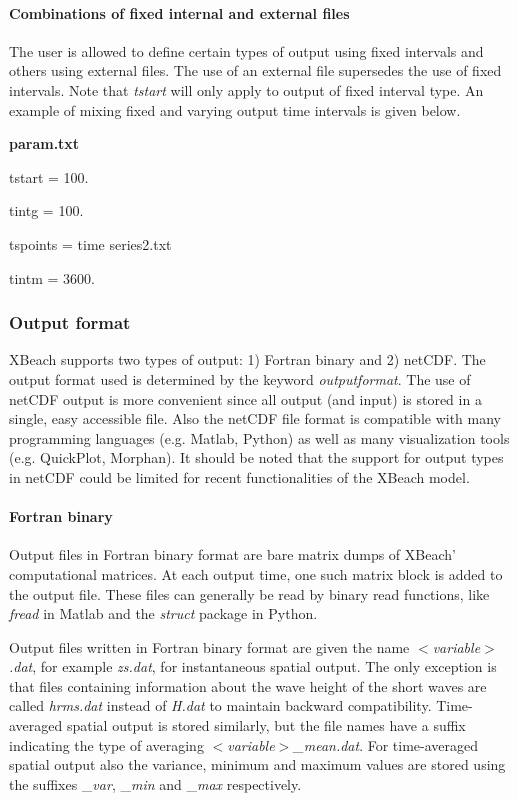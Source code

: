 \documentclass{article}
\begin{document}
\paragraph{ Combinations of fixed internal and external files}

\noindent The user is allowed to define certain types of output using fixed intervals and others using external files. The use of an external file supersedes the use of fixed intervals. Note that \textit{tstart} will only apply to output of fixed interval type. An example of mixing fixed and varying output time intervals is given below.

\noindent \textbf{param.txt}

\noindent tstart = 100.

\noindent tintg = 100.

\noindent tspoints = time series2.txt

\noindent tintm = 3600.


\subsubsection{ Output format}

\noindent XBeach supports two types of output: 1) Fortran binary and 2) netCDF. The output format used is determined by the keyword \textit{outputformat}. The use of netCDF output is more convenient since all output (and input) is stored in a single, easy accessible file. Also the netCDF file format is compatible with many programming languages (e.g. Matlab, Python) as well as many visualization tools (e.g. QuickPlot, Morphan). It should be noted that the support for output types in netCDF could be limited for recent functionalities of the XBeach model.


\paragraph{ Fortran binary}

\noindent Output files in Fortran binary format are bare matrix dumps of XBeach' computational matrices. At each output time, one such matrix block is added to the output file. These files can generally be read by binary read functions, like \textit{fread} in Matlab and the \textit{struct} package in Python.

\noindent Output files written in Fortran binary format are given the name \textit{$<$variable$>$.dat}, for example \textit{zs.dat}, for instantaneous spatial output. The only exception is that files containing information about the wave height of the short waves are called \textit{hrms.dat} instead of \textit{H.dat} to maintain backward compatibility. Time-averaged spatial output is stored similarly, but the file names have a suffix indicating the type of averaging \textit{$<$variable$>$\_mean.dat}. For time-averaged spatial output also the variance, minimum and maximum values are stored using the suffixes \_\textit{var}, \_\textit{min} and \_\textit{max} respectively.
\end{document}
